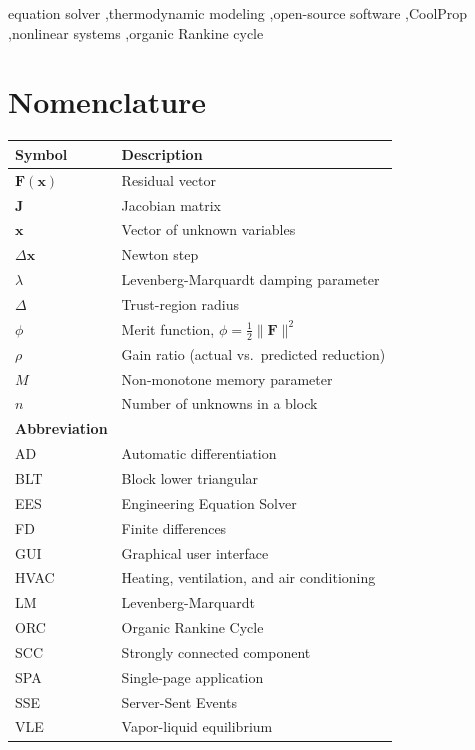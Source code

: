 \documentclass[review,3p]{elsarticle}
\begin{document}
\begin{frontmatter}
\begin{keyword}
equation solver \sep thermodynamic modeling \sep open-source software \sep CoolProp \sep nonlinear systems \sep organic Rankine cycle
\end{keyword}

\end{frontmatter}

\section*{Nomenclature}
\begin{tabular}{@{}ll@{}}
\toprule
\textbf{Symbol} & \textbf{Description} \\
\midrule
$\mathbf{F}(\mathbf{x})$ & Residual vector \\
$\mathbf{J}$    & Jacobian matrix \\
$\mathbf{x}$    & Vector of unknown variables \\
$\Delta\mathbf{x}$ & Newton step \\
$\lambda$       & Levenberg-Marquardt damping parameter \\
$\Delta$        & Trust-region radius \\
$\phi$          & Merit function, $\phi = \frac{1}{2}\|\mathbf{F}\|^2$ \\
$\rho$          & Gain ratio (actual vs.\ predicted reduction) \\
$M$             & Non-monotone memory parameter \\
$n$             & Number of unknowns in a block \\
\midrule
\textbf{Abbreviation} & \\
\midrule
AD    & Automatic differentiation \\
BLT   & Block lower triangular \\
EES   & Engineering Equation Solver \\
FD    & Finite differences \\
GUI   & Graphical user interface \\
HVAC  & Heating, ventilation, and air conditioning \\
LM    & Levenberg-Marquardt \\
ORC   & Organic Rankine Cycle \\
SCC   & Strongly connected component \\
SPA   & Single-page application \\
SSE   & Server-Sent Events \\
VLE   & Vapor-liquid equilibrium \\
\bottomrule
\end{tabular}
\end{document}
